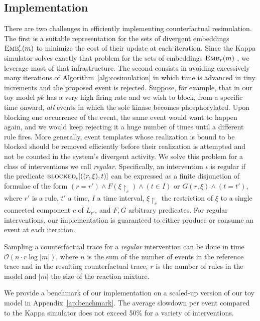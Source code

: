 
\subsection{Implementation}\label{subsec:implementation}

There are two challenges in efficiently implementing counterfactual
resimulation. The first is a suitable representation for the sets of
divergent embeddings ${\textsc{Emb}}'_{r}(m)$ to minimize the cost of their
update at each iteration. Since the Kappa simulator solves exactly
that problem for the sets of embeddings ${\textsc{Emb}}_{r}(m)$
\cite{DanosEtAl-APLAS07}, we leverage most of that infrastructure. The
second consists in avoiding excessively many iterations of
Algorithm~\ref{alg:cosimulation} in which time is advanced in tiny
increments and the proposed event is rejected.
Suppose, for example, that in our toy model
$pk$ has a very high firing rate and we wish to block, from a
specific time onward, \emph{all} events in which the sole kinase
becomes phosphorylated. Upon blocking one occurrence of the event, the
same event would want to happen again, and we would keep rejecting it
a huge number of times until a different rule fires. More generally,
event templates whose realization is bound to be blocked should be
removed efficiently before their realization is attempted and not be
counted in the system's divergent activity. We solve this problem
for a class of interventions we call \emph{regular}.
Specifically, an intervention $\iota$ is regular if
the predicate ${\textsc{blocked}}_{\iota}[((r, \xi), t)]$ can be expressed as a
finite disjunction of formulae of the form
$(r \!=\! r') \wedge F(\xi{\restriction_{c}}) \wedge (t \!\in\! I)$ or
$G(r, \xi) \wedge (t \!=\! t')$, where $r'$ is a rule, $t'$ a time, $I$ a
time interval, $\xi{\restriction_{c}}$ the restriction of $\xi$ to a
single connected component $c$ of $L_{r'}$, and $F, G$ arbitrary
predicates. For regular interventions, our implementation is
guaranteed to either produce or consume an event at each iteration.

\begin{proposition}
  Sampling a counterfactual trace for a \emph{regular} intervention
  can be done in time $\mathcal{O}(n \cdot r \log|m|)$, where $n$ is
  the sum of the number of events in the reference trace and in the
  resulting counterfactual trace, $r$ is the number of rules in the
  model and $|m|$ the size of the reaction mixture.
\end{proposition}

We provide a benchmark of our implementation on a scaled-up version of
our toy model in Appendix~\ref{ap:benchmark}. The average slowdown per
event compared to the Kappa simulator does not exceed 50\% for a
variety of interventions.

\medskip